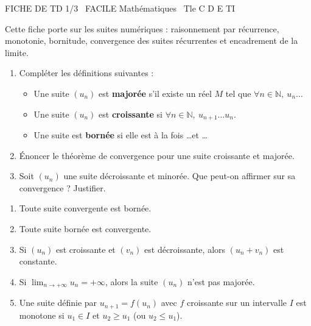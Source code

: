 \documentclass[11pt]{article}
\begin{document}
\begin{tcolorbox}[enhanced,colback=popink,colframe=popink,arc=10pt,boxrule=0pt,left=12pt,right=12pt,top=9pt,bottom=9pt]
{\color{white}\popxbold\small FICHE DE TD 1/3 \textbullet\ FACILE \hfill Mathématiques \textbullet\ Tle C D E TI\par}
\end{tcolorbox}
\vspace{4pt}
\noindent Cette fiche porte sur les suites numériques : raisonnement par récurrence, monotonie, bornitude, convergence des suites récurrentes et encadrement de la limite.

\begin{exercice}
\begin{enumerate}
    \item Compléter les définitions suivantes :
    \begin{itemize}
        \item Une suite $(u_n)$ est \textbf{majorée} s'il existe un réel $M$ tel que $\forall n \in \mathbb{N},\ u_n \dots$
        \item Une suite $(u_n)$ est \textbf{croissante} si $\forall n \in \mathbb{N},\ u_{n+1} \dots u_n$.
        \item Une suite est \textbf{bornée} si elle est à la fois \dots et \dots
    \end{itemize}
    \item Énoncer le théorème de convergence pour une suite croissante et majorée.
    \item Soit $(u_n)$ une suite décroissante et minorée. Que peut-on affirmer sur sa convergence ? Justifier.
\end{enumerate}
\end{exercice}

\begin{exercice}
\begin{enumerate}
    \item Toute suite convergente est bornée.
    \item Toute suite bornée est convergente.
    \item Si $(u_n)$ est croissante et $(v_n)$ est décroissante, alors $(u_n + v_n)$ est constante.
    \item Si $\lim_{n\to+\infty} u_n = +\infty$, alors la suite $(u_n)$ n'est pas majorée.
    \item Une suite définie par $u_{n+1} = f(u_n)$ avec $f$ croissante sur un intervalle $I$ est monotone si $u_1 \in I$ et $u_2 \geq u_1$ (ou $u_2 \leq u_1$).
\end{enumerate}
\end{exercice}
\end{document}
